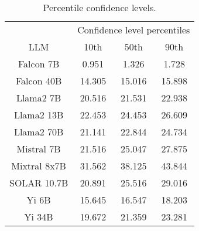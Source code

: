 \begin{table*}
\centering
\begin{tabular}{c|c|c|c}
& \multicolumn{3}{c}{Confidence level percentiles} \\ 
LLM & 10th & 50th & 90th\\ \hline
Falcon 7B & 0.951 & 1.326 & 1.728\\
Falcon 40B & 14.305 & 15.016 & 15.898\\
Llama2 7B & 20.516 & 21.531 & 22.938\\
Llama2 13B & 22.453 & 24.453 & 26.609\\
Llama2 70B & 21.141 & 22.844 & 24.734\\
Mistral 7B & 21.516 & 25.047 & 27.875\\
Mixtral 8x7B & 31.562 & 38.125 & 43.844\\
SOLAR 10.7B & 20.891 & 25.516 & 29.016\\
Yi 6B & 15.645 & 16.547 & 18.203\\
Yi 34B & 19.672 & 21.359 & 23.281\\
\hline
\end{tabular}
\caption{Percentile confidence levels.}
\label{tab:percentile_conf}
\end{table*}

